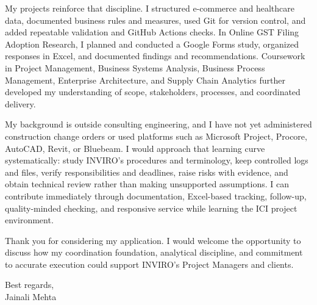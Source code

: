 \documentclass[letterpaper,11pt]{article}
\begin{document}
\bigbreak
My projects reinforce that discipline. I structured e-commerce and healthcare data, documented business rules and measures, used Git for version control, and added repeatable validation and GitHub Actions checks. In Online GST Filing Adoption Research, I planned and conducted a Google Forms study, organized responses in Excel, and documented findings and recommendations. Coursework in Project Management, Business Systems Analysis, Business Process Management, Enterprise Architecture, and Supply Chain Analytics further developed my understanding of scope, stakeholders, processes, and coordinated delivery.

\bigbreak
My background is outside consulting engineering, and I have not yet administered construction change orders or used platforms such as Microsoft Project, Procore, AutoCAD, Revit, or Bluebeam. I would approach that learning curve systematically: study INVIRO's procedures and terminology, keep controlled logs and files, verify responsibilities and deadlines, raise risks with evidence, and obtain technical review rather than making unsupported assumptions. I can contribute immediately through documentation, Excel-based tracking, follow-up, quality-minded checking, and responsive service while learning the ICI project environment.

\bigbreak
Thank you for considering my application. I would welcome the opportunity to discuss how my coordination foundation, analytical discipline, and commitment to accurate execution could support INVIRO's Project Managers and clients.

\bigbreak
Best regards,\\
Jainali Mehta
\end{document}
